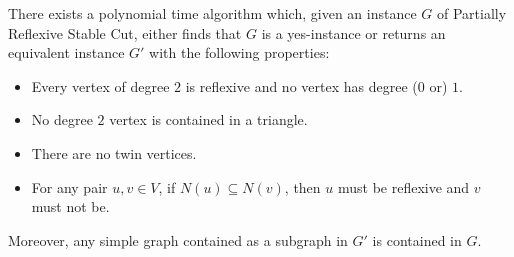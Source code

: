 \documentclass[a4paper,UKenglish,cleveref, autoref,thm-restate]{lipics-v2021}
\begin{document}
\begin{lemma}\label{lem:gen-obs}
There exists a polynomial time algorithm which, given an instance $G$ of {\sc Partially Reflexive Stable Cut}, either finds that $G$ is a yes-instance or returns an equivalent instance $G'$ with the following properties:
\begin{itemize}
    \item[1.] Every vertex of degree $2$ is reflexive and no vertex has degree ($0$ or) $1$.
    \item[2.] No degree $2$ vertex is contained in a triangle.
    \item[3.] There are no twin vertices.
    \item[4.] For any pair $u,v \in V$, if $N(u) \subseteq N(v)$, then $u$ must be reflexive and $v$ must not be.
\end{itemize}

Moreover, any simple graph contained as a subgraph in $G'$ is contained in $G$.

\end{lemma}
\end{document}
